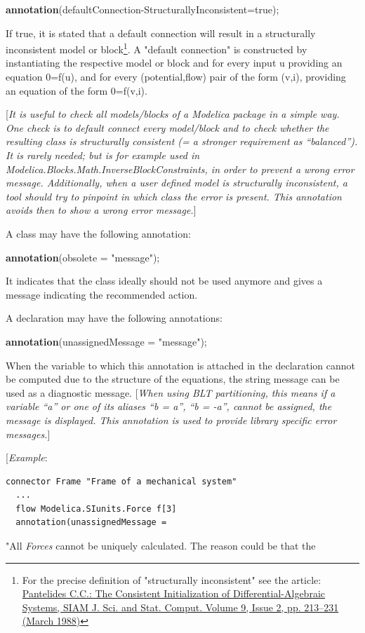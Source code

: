\documentclass[10pt,a4paper]{report}
\begin{document}
\textbf{annotation}(defaultConnection-StructurallyInconsistent=true);

If true, it is stated that a default connection will result in a
structurally inconsistent model or block\footnote{For the precise
  definition of "structurally inconsistent" see the article:
  \href{http://epubs.siam.org/doi/abs/10.1137/0909014}{Pantelides C.C.:
  The Consistent Initialization of Differential-Algebraic Systems, SIAM
  J. Sci. and Stat. Comput. Volume 9, Issue 2, pp. 213--231 (March
  1988)}}. A "default connection" is constructed by instantiating the
respective model or block and for every input u providing an equation
0=f(u), and for every (potential,flow) pair of the form (v,i), providing
an equation of the form 0=f(v,i).

{[}\emph{It is useful to check all models/blocks of a Modelica package
in a simple way. One check is to default connect every model/block and
to check whether the resulting class is structurally consistent (= a
stronger requirement as ``balanced''). It is rarely needed; but is for
example used in Modelica.Blocks.Math.InverseBlockConstraints, in order
to prevent a wrong error message. Additionally, when a user defined
model is structurally inconsistent, a tool should try to pinpoint in
which class the error is present. This annotation avoids then to show a
wrong error message.}{]}

A class may have the following annotation:

\textbf{annotation}(obsolete = "message");

It indicates that the class ideally should not be used anymore and gives
a message indicating the recommended action.

A declaration may have the following annotations:

\textbf{annotation}(unassignedMessage = "message");

When the variable to which this annotation is attached in the
declaration cannot be computed due to the structure of the equations,
the string message can be used as a diagnostic message. {[}\emph{When
using BLT partitioning, this means if a variable ``a'' or one of its
aliases ``b = a'', ``b = -a'', cannot be assigned, the message is
displayed. This annotation is used to provide library specific error
messages.}{]}

{[}\emph{Example}:

\begin{lstlisting}[language=modelica]
connector Frame "Frame of a mechanical system"
  ...
  flow Modelica.SIunits.Force f[3]
  annotation(unassignedMessage =
\end{lstlisting}
"All \emph{Forces} cannot be uniquely calculated. The reason could be
that the
\end{document}
